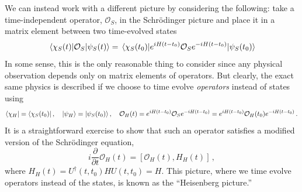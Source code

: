 \documentclass{article}
\numberwithin{equation}{subsection}
\begin{document}
We can instead work with a different picture by considering the following: take a time-independent operator, $\mathcal{O}_S$, in the Schr\"odinger picture and place 
it in a matrix element between two time-evolved states
\begin{equation}
    \mel{\chi_S(t)}{\mathcal{O}_S}{\psi_S(t)} = \mel{\chi_S(t_0)}{e^{iH(t-t_0)}\mathcal{O}_Se^{-iH(t-t_0)}}{\psi_S(t_0)}
\end{equation}
In some sense, this is the only reasonable thing to consider since any physical observation depends only on matrix elements of operators. But clearly, the exact same 
physics is described if we choose to time evolve \textit{operators} instead of states using
\begin{equation}
    \bra{\chi_H} = \bra{\chi_S(t_0)}, \quad \ket{\psi_H} = \ket{\psi_S(t_0)}, \quad \mathcal{O}_H(t) = e^{iH(t-t_0)}\mathcal{O}_Se^{-iH(t-t_0)} = e^{iH(t-t_0)}\mathcal{O}_H(t_0)e^{-iH(t-t_0)}\,.
\end{equation}
It is a straightforward exercise to show that such an operator satisfies a modified version of the Schr\"odinger equation,
\begin{equation}
    i\frac{\partial}{\partial t}\mathcal{O}_H(t) = [\mathcal{O}_H(t), H_H(t)]\,,
\end{equation}
where $H_H(t) = U^\dag(t, t_0)HU(t,t_0) = H$. This picture, where we time evolve operators instead of the states, is known as the ``Heisenberg picture.''
\end{document}
